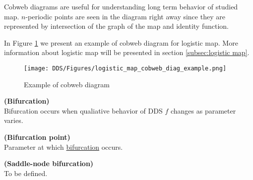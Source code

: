 \begin{remark}
    Cobweb diagrams are useful for understanding long term behavior of studied map.
    $n$-periodic points are seen in the diagram right away since they are represented by intersection of the graph of the map and identity function.
\end{remark}

\begin{example}
    In Figure \ref{fig:cobweb_diag_example} we present an example of cobweb diagram for logistic map. More information about logistic map will be presented in section \ref{subsec:logistic map}.
    \begin{figure}[!h]
        \centering
        \texttt{[image: DDS/Figures/logistic\_map\_cobweb\_diag\_example.png]}
        \caption{Example of cobweb diagram}
        \label{fig:cobweb_diag_example}
    \end{figure}
\end{example}

\begin{definition} \textbf{(Bifurcation)} \\
    \label{def:bifurcation}
    Bifurcation occurs when qualiative behavior of DDS $f$ changes as parameter varies.
\end{definition}

\begin{definition} \textbf{(Bifurcation point)} \\
    \label{def:bifurcation_point}
    Parameter at which \hyperref[def:bifurcation]{bifurcation} occurs.
\end{definition}

\begin{definition} \textbf{(Saddle-node bifurcation)} \\
    \label{def:saddle_node_bif}
    To be defined.
\end{definition}


